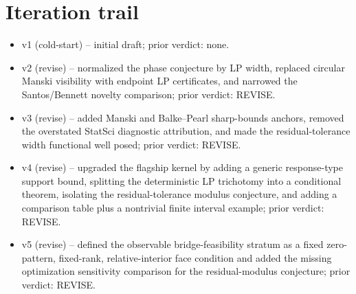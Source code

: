 \documentclass[11pt]{article}
\theoremstyle{definition}
\theoremstyle{plain}
\theoremstyle{remark}
\begin{document}
\section{Iteration trail}
\begin{itemize}[leftmargin=*]
\item v1 (cold-start) -- initial draft; prior verdict: none.
\item v2 (revise) -- normalized the phase conjecture by LP width,
replaced circular Manski visibility with endpoint LP certificates, and
narrowed the Santos/Bennett novelty comparison; prior verdict: REVISE.
\item v3 (revise) -- added Manski and Balke--Pearl sharp-bounds anchors,
removed the overstated StatSci diagnostic attribution, and made the
residual-tolerance width functional well posed; prior verdict: REVISE.
\item v4 (revise) -- upgraded the flagship kernel by adding a generic
response-type support bound, splitting the deterministic LP trichotomy into a
conditional theorem, isolating the residual-tolerance modulus conjecture, and
adding a comparison table plus a nontrivial finite interval example; prior
verdict: REVISE.
\item v5 (revise) -- defined the observable bridge-feasibility stratum as a
fixed zero-pattern, fixed-rank, relative-interior face condition and added
the missing optimization sensitivity comparison for the residual-modulus
conjecture; prior verdict: REVISE.
\end{itemize}
\end{document}
